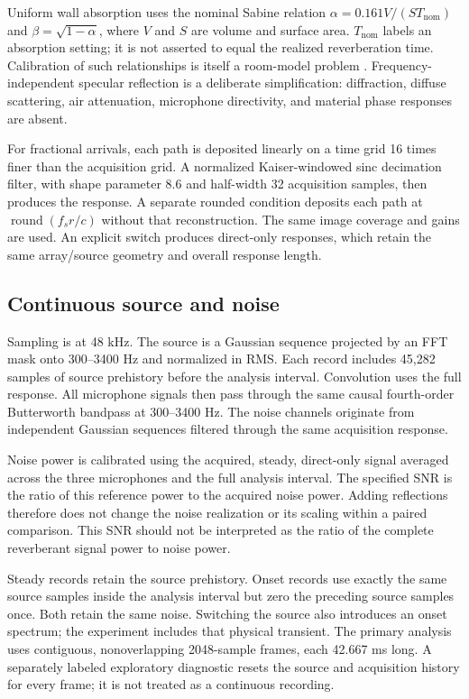 \documentclass[10pt,a4paper,twocolumn]{article}
\begin{document}
Uniform wall absorption uses the nominal Sabine relation $\alpha=0.161V/(S T_{\mathrm{nom}})$ and $\beta=\sqrt{1-\alpha}$, where $V$ and $S$ are volume and surface area. $T_{\mathrm{nom}}$ labels an absorption setting; it is not asserted to equal the realized reverberation time. Calibration of such relationships is itself a room-model problem \citep{bellows}. Frequency-independent specular reflection is a deliberate simplification: diffraction, diffuse scattering, air attenuation, microphone directivity, and material phase responses are absent.

For fractional arrivals, each path is deposited linearly on a time grid 16 times finer than the acquisition grid. A normalized Kaiser-windowed sinc decimation filter, with shape parameter 8.6 and half-width 32 acquisition samples, then produces the response. A separate rounded condition deposits each path at $\operatorname{round}(f_s r/c)$ without that reconstruction. The same image coverage and gains are used. An explicit switch produces direct-only responses, which retain the same array/source geometry and overall response length.

\subsection{Continuous source and noise}
Sampling is at 48 kHz. The source is a Gaussian sequence projected by an FFT mask onto 300--3400 Hz and normalized in RMS. Each record includes 45,282 samples of source prehistory before the analysis interval. Convolution uses the full response. All microphone signals then pass through the same causal fourth-order Butterworth bandpass at 300--3400 Hz. The noise channels originate from independent Gaussian sequences filtered through the same acquisition response.

Noise power is calibrated using the acquired, steady, direct-only signal averaged across the three microphones and the full analysis interval. The specified SNR is the ratio of this reference power to the acquired noise power. Adding reflections therefore does not change the noise realization or its scaling within a paired comparison. This SNR should not be interpreted as the ratio of the complete reverberant signal power to noise power.

Steady records retain the source prehistory. Onset records use exactly the same source samples inside the analysis interval but zero the preceding source samples once. Both retain the same noise. Switching the source also introduces an onset spectrum; the experiment includes that physical transient. The primary analysis uses contiguous, nonoverlapping 2048-sample frames, each 42.667 ms long. A separately labeled exploratory diagnostic resets the source and acquisition history for every frame; it is not treated as a continuous recording.
\end{document}
